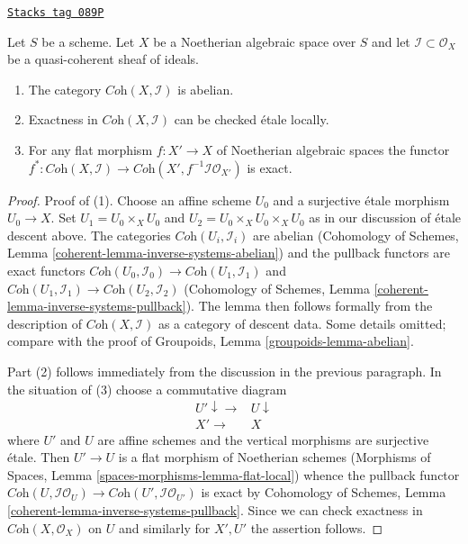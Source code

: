 \begin{lemma}
\label{spaces-more-morphisms-lemma-inverse-systems-abelian}
\href{https://stacks.math.columbia.edu/tag/089P}{\texttt{Stacks tag 089P}}

Let $S$ be a scheme. Let $X$ be a Noetherian algebraic space over $S$ and
let $\mathcal{I} \subset \mathcal{O}_X$ be a quasi-coherent sheaf of ideals.
\begin{enumerate}
\item The category $\textit{Coh}(X, \mathcal{I})$ is abelian.
\item Exactness in $\textit{Coh}(X, \mathcal{I})$
can be checked \'etale locally.
\item For any flat morphism $f : X' \to X$ of Noetherian algebraic spaces
the functor $f^* : \textit{Coh}(X, \mathcal{I}) \to
\textit{Coh}(X', f^{-1}\mathcal{I}\mathcal{O}_{X'})$ is exact.
\end{enumerate}
\end{lemma}

\begin{proof}
Proof of (1). Choose an affine scheme $U_0$ and a surjective \'etale morphism
$U_0 \to X$. Set $U_1 = U_0 \times_X U_0$ and
$U_2 = U_0 \times_X U_0 \times_X U_0$ as in our discussion of
\'etale descent above. The categories $\textit{Coh}(U_i, \mathcal{I}_i)$
are abelian
(Cohomology of Schemes, Lemma \ref{coherent-lemma-inverse-systems-abelian})
and the pullback functors are exact functors
$\textit{Coh}(U_0, \mathcal{I}_0) \to \textit{Coh}(U_1, \mathcal{I}_1)$
and
$\textit{Coh}(U_1, \mathcal{I}_1) \to \textit{Coh}(U_2, \mathcal{I}_2)$
(Cohomology of Schemes, Lemma \ref{coherent-lemma-inverse-systems-pullback}).
The lemma then follows formally from the description of
$\textit{Coh}(X, \mathcal{I})$ as a category of descent data.
Some details omitted; compare with the proof of
Groupoids, Lemma \ref{groupoids-lemma-abelian}.

\medskip\noindent
Part (2) follows immediately from the discussion in the previous paragraph.
In the situation of (3) choose a commutative diagram
$$
\begin{array}{cc}U' \downarrow\longrightarrow & U \downarrow \\ X' \longrightarrow & X\end{array}
$$
where $U'$ and $U$ are affine schemes and the vertical morphisms are
surjective \'etale. Then $U' \to U$ is a flat morphism of Noetherian
schemes (Morphisms of Spaces, Lemma \ref{spaces-morphisms-lemma-flat-local})
whence the pullback functor
$\textit{Coh}(U, \mathcal{I}\mathcal{O}_U) \to
\textit{Coh}(U', \mathcal{I}\mathcal{O}_{U'})$
is exact by
Cohomology of Schemes, Lemma \ref{coherent-lemma-inverse-systems-pullback}.
Since we can check exactness in $\textit{Coh}(X, \mathcal{O}_X)$
on $U$ and similarly for $X', U'$ the assertion follows.
\end{proof}

